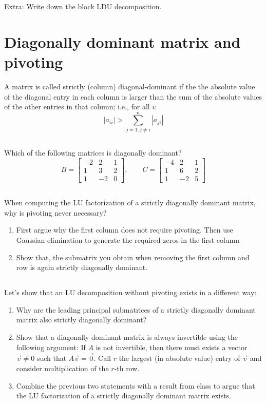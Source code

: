 \documentclass[11pt,letterpaper]{report}
\begin{document}
Extra: Write down the block LDU decomposition. 

\section{Diagonally dominant matrix and pivoting}
A matrix is called strictly (column) diagonal-dominant if the
 the absolute value of the diagonal entry in each column is larger than
 the sum of the absolute values of the other entries in that
 column; i.e., for all $i$:
 $$
 |a_{ii}|>\sum_{j=1, j\not=i}^n |a_{ji}|
 $$
 
\subsection{}
Which of the following matrices is diagonally dominant?
$$
 B={\begin{bmatrix}-2&2&1\\1&3&2\\1&-2&0\end{bmatrix}}, \qquad
 C={\begin{bmatrix}-4&2&1\\1&6&2\\1&-2&5\end{bmatrix}}
$$

\subsection{}
When computing the LU
 factorization of a strictly diagonally dominant matrix, why is
 pivoting never necessary? 

\begin{enumerate}
    \item First argue why the first column does not require pivoting. Then use Gaussian elimination to generate the required zeros in the first column
    \item Show that, the submatrix you obtain when removing the first column and row is again strictly  diagonally dominant.
\end{enumerate}


\subsection{}
Let's show that an LU decomposition without pivoting exists in a different way:
  \begin{enumerate}
    \item Why are the leading principal submatrices of a strictly
      diagonally dominant matrix also strictly diagonally dominant?
    \item Show that a diagonally dominant matrix is always invertible
      using the following argument: If $A$ is not invertible, then
      there must exists a vector $\vec v\not=0$ such that
      $A\vec v = \vec 0$. Call $r$ the largest (in
      absolute value) entry of $\vec v$ and consider
      multiplication of the $r$-th row. 
    \item Combine the previous two statements with a result from class
      to argue that the LU factorization of a strictly diagonally
      dominant matrix exists.
 \end{enumerate}
 
\end{document}
